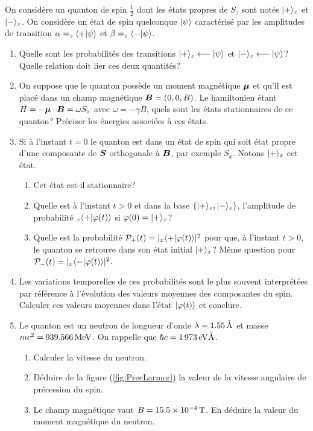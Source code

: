 On considère un quanton de spin $\frac{1}{2}$ dont les états propres de
$S_z$ sont notés $\vert+\rangle_z$ et $\vert-\rangle_z$. On considère un état de spin
quelconque $\vert\psi\rangle$ caractérisé par les amplitudes de transition
$\alpha=_z\langle+\vert\psi\rangle$ et $\beta=_z\langle-\vert\psi\rangle$.

\begin{enumerate}
\item Quelle sont les probabilités des transitions $\vert+\rangle_z\longleftarrow
\vert\psi\rangle$ et $\vert-\rangle_z\longleftarrow\vert\psi\rangle$? Quelle relation doit lier
ces deux quantités?

\item On suppose que le quanton possède un moment magnétique $\boldsymbol{\mu
}$ et qu'il est placé dans un champ magnétique $\boldsymbol{B}=(0,0,B)$. Le
hamiltonien étant $H=-\boldsymbol{\mu}\cdot\boldsymbol{B}=\omega S_z$ avec
$\omega=-\gamma B$, quels sont les états stationnaires de ce quanton? Préciser
les énergies associées à ces états.

\item Si à l'instant $t=0$ le quanton est dans un état de spin qui soit état
propre d'une composante de $\boldsymbol{S}$ orthogonale à $\boldsymbol{B}$,
par exemple $S_{x}$. Notons $\vert+\rangle_{x}$ cet état.

\begin{enumerate}
\item Cet état est-il stationnaire?

\item Quelle est à l'instant $t>0$ et dans la base $\{\vert+\rangle_z,\vert-\rangle_z
\}$, l'amplitude de probabilité $_{x}\langle+\vert\varphi(t)\rangle$ si
$\varphi(0)=\vert+\rangle_{x}$?

\item Quelle est la probabilité $\mathcal{P}_{+}(t)=|_{x}\langle
+\vert\varphi(t)\rangle|^{2}$ pour que, à l'instant $t>0$, le quanton se retrouve dans
son état initial $\vert+\rangle_{x}$? Même question pour $\mathcal{P}_{-}(t)=
|_{x}\langle -\vert\varphi(t)\rangle|^{2}$.
\end{enumerate}

\item Les variations temporelles de ces probabilités sont le plus souvent
interprétées par référence à l'évolution des valeurs moyennes des composantes
du spin. Calculer ces valeurs moyennes dans l'état $\vert\varphi(t)\rangle$ et
conclure.

\item Le quanton est un neutron de longueur d'onde
$\lambda=1.55\operatorname{\mathring{A}}$ et masse $mc^{2}=939.566\operatorname{MeV}$.
On rappelle que $\hbar c=1\,973\operatorname{eV\mathring{A}}$.

\begin{enumerate}
\item Calculer la vitesse du neutron.

\item Déduire de la figure (\ref{fig:PrecLarmor}) la valeur de la vitesse
angulaire de précession du spin.

\item Le champ magnétique vaut $B=15.5\times10^{-4}\operatorname{T}$. En déduire
la valeur du moment magnétique du neutron.
\end{enumerate}
\end{enumerate}

